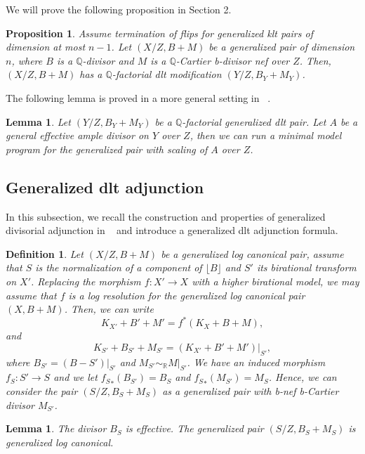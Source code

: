\documentclass{amsart}
\renewcommand{\qq}{\mathbb{Q}}
\newcommand{\rr}{\mathbb{R}}
\newtheorem{lemma}[theorem]{Lemma}
\newtheorem{proposition}[theorem]{Proposition}
\newtheorem{definition}[theorem]{Definition}
\theoremstyle{remark}
\numberwithin{equation}{section}
\begin{document}
We will prove the following proposition in Section 2.

\begin{proposition}\label{dltmodification}
Assume termination of flips for generalized klt pairs of dimension at most $n-1$.
Let $(X/Z,B+M)$ be a generalized pair of dimension $n$, 
where $B$ is a $\qq$-divisor and $M$ is a $\qq$-Cartier b-divisor nef over $Z$.
Then, $(X/Z,B+M)$ 
has a $\qq$-factorial dlt modification $(Y/Z,B_Y+M_Y)$.
\end{proposition}

The following lemma is proved in a more general setting in ~\cite[Section 4]{BZ16}.

\begin{lemma}\label{mmpdltmodel}
Let $(Y/Z,B_Y+M_Y)$ be a $\qq$-factorial generalized dlt pair.
Let $A$ be a general effective ample divisor on $Y$ over $Z$,
then we can run a minimal model program for the generalized pair with scaling of $A$ over $Z$.
\end{lemma}


\subsection{Generalized dlt adjunction}\label{S-gad}
In this subsection, we recall the construction and properties of generalized divisorial adjunction in ~\cite{BZ16}
and introduce a generalized dlt adjunction formula.

\begin{definition}\label{genadj}
Let $(X/Z,B+M)$ be a generalized log canonical pair, 
assume that $S$ is the normalization of a component of $\lfloor B \rfloor$ 
and $S'$ its birational transform on $X'$.
Replacing the morphism $f\colon X'\rightarrow X$ with a higher birational model,  
we may assume that $f$ is a log resolution for the generalized log canonical pair $(X,B+M)$.
Then, we can write
\[
K_{X'}+B'+M'= f^*(K_X+B+M),
\]
and 
\[
K_{S'}+B_{S'}+M_{S'}= (K_{X'}+B'+M')|_{S'},
\]
where $B_{S'}=(B-{S'})|_{S'}$ and $M_{S'}\sim_\rr M|_{S'}$.
We have an induced morphism $f_S \colon S'\rightarrow S$
and we let ${f_S}_*(B_{S'})=B_S$ and ${f_S}_*(M_{S'})=M_S$.
Hence, we can consider the pair $(S/Z,B_S+M_S)$ as a generalized pair
with b-nef b-Cartier divisor $M_{S'}$.
\end{definition}

\begin{lemma}
The divisor $B_{S}$ is effective. The generalized pair $(S/Z,B_S+M_S)$ is generalized log canonical.
\end{lemma}
\end{document}
